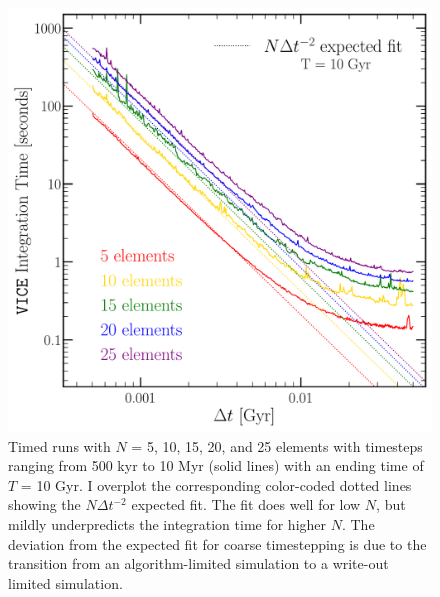 \documentclass{report}
\begin{document}
\begin{figure}[!ht]
\centering
\includegraphics[scale = 0.4]{../timer/timer.pdf}
\caption{Timed runs with $N$ = 5, 10, 15, 20, and 25 elements with timesteps 
ranging from 500 kyr to 10 Myr (solid lines) with an ending time of 
$T$ = 10 Gyr. I overplot the corresponding color-coded dotted lines showing 
the $N\Delta t^{-2}$ expected fit. The fit does well for low $N$, but 
mildly underpredicts the integration time for higher $N$. The deviation from 
the expected fit for coarse timestepping is due to the transition from an 
algorithm-limited simulation to a write-out limited simulation.}
\label{fig:timer}
\end{figure} 


% 
% 
\end{document}
